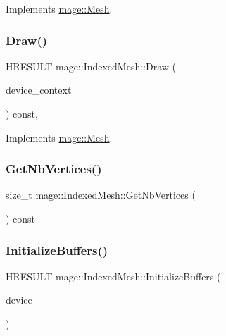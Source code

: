 Implements \hyperlink{classmage_1_1_mesh_a0e558e82b0db25b0bbb4abeba9f0fb0f}{mage\+::\+Mesh}.

\hypertarget{classmage_1_1_indexed_mesh_a7067c08cb9165cef96f507b8dd9fe568}{}\label{classmage_1_1_indexed_mesh_a7067c08cb9165cef96f507b8dd9fe568} 
\subsubsection{\texorpdfstring{Draw()}{Draw()}}
{\footnotesize\ttfamily H\+R\+E\+S\+U\+LT mage\+::\+Indexed\+Mesh\+::\+Draw (\begin{DoxyParamCaption}\item[{\hyperlink{namespacemage_ae74f374780900893caa5555d1031fd79}{Com\+Ptr}$<$ I\+D3\+D11\+Device\+Context2 $>$}]{device\+\_\+context }\end{DoxyParamCaption}) const\hspace{0.3cm}{\ttfamily [override]}, {\ttfamily [virtual]}}



Implements \hyperlink{classmage_1_1_mesh_a9dff8fa94d28e852fc1e72e6c0a85c6f}{mage\+::\+Mesh}.

\hypertarget{classmage_1_1_indexed_mesh_ace923913f29e49a571c32b3fb76f6474}{}\label{classmage_1_1_indexed_mesh_ace923913f29e49a571c32b3fb76f6474} 
\subsubsection{\texorpdfstring{Get\+Nb\+Vertices()}{GetNbVertices()}}
{\footnotesize\ttfamily size\+\_\+t mage\+::\+Indexed\+Mesh\+::\+Get\+Nb\+Vertices (\begin{DoxyParamCaption}{ }\end{DoxyParamCaption}) const}

\hypertarget{classmage_1_1_indexed_mesh_a164cc8bcbf150f5bb7a26039f684d062}{}\label{classmage_1_1_indexed_mesh_a164cc8bcbf150f5bb7a26039f684d062} 
\subsubsection{\texorpdfstring{Initialize\+Buffers()}{InitializeBuffers()}}
{\footnotesize\ttfamily H\+R\+E\+S\+U\+LT mage\+::\+Indexed\+Mesh\+::\+Initialize\+Buffers (\begin{DoxyParamCaption}\item[{\hyperlink{namespacemage_ae74f374780900893caa5555d1031fd79}{Com\+Ptr}$<$ I\+D3\+D11\+Device2 $>$}]{device }\end{DoxyParamCaption})\hspace{0.3cm}{\ttfamily [protected]}}

